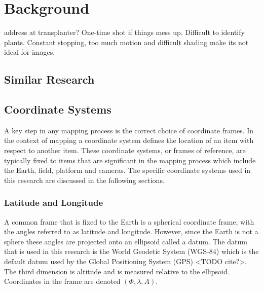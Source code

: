 
\cleardoublepage

\chapter{Background}
\label{background}

address at transplanter?  One-time shot if things mess up.  Difficult to identify plants.  Constant stopping, too much motion and difficult shading make its not ideal for images. 

\section{Similar Research}
\label{section:similar_research}


\section{Coordinate Systems}

A key step in any mapping process is the correct choice of coordinate frames.  In the context of mapping a coordinate system defines the location of an item with respect to another item.  These coordinate systems, or frames of reference, are typically fixed to items that are significant in the mapping process which include the Earth, field, platform and cameras.  The specific coordinate systems used in this research are discussed in the following sections.

\subsection{Latitude and Longitude}

A common frame that is fixed to the Earth is a spherical coordinate frame, with the angles referred to as latitude and longitude. However, since the Earth is not a sphere these angles are projected onto an ellipsoid called a datum.  The datum that is used in this research is the World Geodetic System (WGS-84) which is the default datum used by the Global Positioning System (GPS) <TODO cite?>.  The third dimension is altitude and is measured relative to the ellipsoid.  Coordinates in the frame are denoted $(\Phi, \lambda, A)$.

